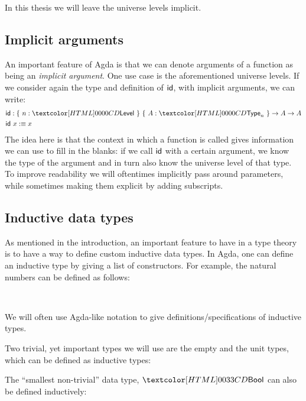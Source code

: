 In this thesis we will leave the universe levels implicit.

\subsection{Implicit arguments}

An important feature of Agda is that we can denote arguments of a
function as being an \emph{implicit argument}. One use case is the
aforementioned universe levels. If we consider again the type and
definition of $\id$, with implicit arguments, we can write:
\begin{align*}
&\id : \{\ n : \Level\ \}\ \{\ A : \Type_n\ \} \to A \to A \\
&\id\ x \ddefeq x
\end{align*}
The idea here is that the context in which a function is called gives
information we can use to fill in the blanks: if we call $\id$ with a
certain argument, we know the type of the argument and in turn also
know the universe level of that type. To improve readability we will
oftentimes implicitly pass around parameters, while sometimes making
them explicit by adding subscripts.

\subsection{Inductive data types}

As mentioned in the introduction, an important feature to have in a
type theory is to have a way to define custom inductive data types. In
Agda, one can define an inductive type by giving a list of
constructors. For example, the natural numbers can be defined as
follows:
\begin{datatype}{\natty}{\Type}
  \constr{\natzero}{\natty} \\
  \constr{\natsucc}{\natty \to \natty}
\end{datatype}
We will often use Agda-like notation to give
definitions/specifications of inductive types.

Two trivial, yet important types we will use are the empty and the
unit types, which can be defined as inductive types:
\begin{datatype}{\emptyty}{\Type}
\end{datatype}
%
\begin{datatype}{\unitty}{\Type}
  \constr{\unitval}{\unitty}
\end{datatype}
%
The ``smallest non-trivial'' data type, $\boolty$ can also be defined
inductively:
\begin{datatype}{\boolty}{\Type}
  \constr{\booltrue}{\boolty} \\
  \constr{\boolfalse}{\boolty}
\end{datatype}

